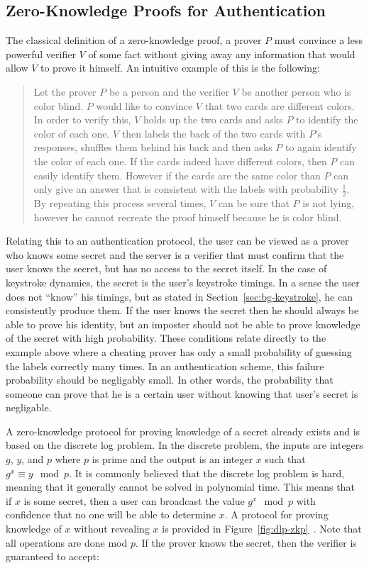 \documentclass[11pt]{article}
\begin{document}
\subsection{Zero-Knowledge Proofs for Authentication}
\label{fig:bg-zkp}
The classical definition of a zero-knowledge proof, a prover $P$ must convince a less powerful verifier $V$ of some fact without giving away any information that would allow $V$ to prove it himself. An intuitive example of this is the following:

\begin{quote}\small
Let the prover $P$ be a person and the verifier $V$ be another person who is color blind. $P$ would like to convince $V$ that two cards are different colors. In order to verify this, $V$ holds up the two cards and asks $P$ to identify the color of each one. $V$ then labels the back of the two cards with $P$'s responses, shuffles them behind his back and then asks $P$ to again identify the color of each one. If the cards indeed have different colors, then $P$ can easily identify them. However if the cards are the same color than $P$ can only give an answer that is consistent with the labels with probability $\frac12$. By repeating this process several times, $V$ can be sure that $P$ is not lying, however he cannot recreate the proof himself because he is color blind.
\end{quote}

Relating this to an authentication protocol, the user can be viewed as a prover who knows some secret and the server is a verifier that must confirm that the user knows the secret, but has no access to the secret itself. In the case of keystroke dynamics, the secret is the user's keystroke timings. In a sense the user does not ``know'' his timings, but as stated in Section~\ref{sec:bg-keystroke}, he can consistently produce them. If the user knows the secret then he should always be able to prove his identity, but an imposter should not be able to prove knowledge of the secret with high probability. These conditions relate directly to the example above where a cheating prover has only a small probability of guessing the labels correctly many times. In an authentication scheme, this failure probability should be negligably small. In other words, the probability that someone can prove that he is a certain user without knowing that user's secret is negligable.

A zero-knowledge protocol for proving knowledge of a secret already exists and is based on the discrete log problem. In the discrete problem, the inputs are integers $g$, $y$, and $p$ where $p$ is prime and the output is an integer $x$ such that $g^x\equiv y\mod p$. It is commonly believed that the discrete log problem is hard, meaning that it generally cannot be solved in polynomial time. This means that if $x$ is some secret, then a user can broadcast the value $g^x\mod p$ with confidence that no one will be able to determine $x$. A protocol for proving knowledge of $x$ without revealing $x$ is provided in Figure~\ref{fig:dlp-zkp}~\cite{crypto-1986-1125}. Note that all operations are done mod $p$. If the prover knows the secret, then the verifier is guaranteed to accept:
\end{document}
